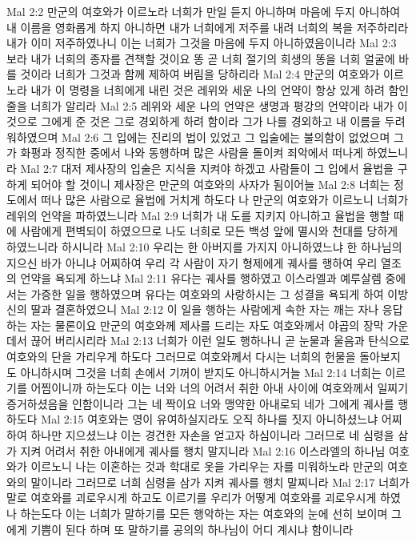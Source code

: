Mal 2:2  만군의 여호와가 이르노라 너희가 만일 듣지 아니하며 마음에 두지 아니하여 내 이름을 영화롭게 하지 아니하면 내가 너희에게 저주를 내려 너희의 복을 저주하리라 내가 이미 저주하였나니 이는 너희가 그것을 마음에 두지 아니하였음이니라
Mal 2:3  보라 내가 너희의 종자를 견책할 것이요 똥 곧 너희 절기의 희생의 똥을 너희 얼굴에 바를 것이라 너희가 그것과 함께 제하여 버림을 당하리라
Mal 2:4  만군의 여호와가 이르노라 내가 이 명령을 너희에게 내린 것은 레위와 세운 나의 언약이 항상 있게 하려 함인 줄을 너희가 알리라
Mal 2:5  레위와 세운 나의 언약은 생명과 평강의 언약이라 내가 이것으로 그에게 준 것은 그로 경외하게 하려 함이라 그가 나를 경외하고 내 이름을 두려워하였으며
Mal 2:6  그 입에는 진리의 법이 있었고 그 입술에는 불의함이 없었으며 그가 화평과 정직한 중에서 나와 동행하며 많은 사람을 돌이켜 죄악에서 떠나게 하였느니라
Mal 2:7  대저 제사장의 입술은 지식을 지켜야 하겠고 사람들이 그 입에서 율법을 구하게 되어야 할 것이니 제사장은 만군의 여호와의 사자가 됨이어늘
Mal 2:8  너희는 정도에서 떠나 많은 사람으로 율법에 거치게 하도다 나 만군의 여호와가 이르노니 너희가 레위의 언약을 파하였느니라
Mal 2:9  너희가 내 도를 지키지 아니하고 율법을 행할 때에 사람에게 편벽되이 하였으므로 나도 너희로 모든 백성 앞에 멸시와 천대를 당하게 하였느니라 하시니라
Mal 2:10  우리는 한 아버지를 가지지 아니하였느냐 한 하나님의 지으신 바가 아니냐 어찌하여 우리 각 사람이 자기 형제에게 궤사를 행하여 우리 열조의 언약을 욕되게 하느냐
Mal 2:11  유다는 궤사를 행하였고 이스라엘과 예루살렘 중에서는 가증한 일을 행하였으며 유다는 여호와의 사랑하시는 그 성결을 욕되게 하여 이방 신의 딸과 결혼하였으니
Mal 2:12  이 일을 행하는 사람에게 속한 자는 깨는 자나 응답하는 자는 물론이요 만군의 여호와께 제사를 드리는 자도 여호와께서 야곱의 장막 가운데서 끊어 버리시리라
Mal 2:13  너희가 이런 일도 행하나니 곧 눈물과 울음과 탄식으로 여호와의 단을 가리우게 하도다 그러므로 여호와께서 다시는 너희의 헌물을 돌아보지도 아니하시며 그것을 너희 손에서 기꺼이 받지도 아니하시거늘
Mal 2:14  너희는 이르기를 어찜이니까 하는도다 이는 너와 너의 어려서 취한 아내 사이에 여호와께서 일찌기 증거하셨음을 인함이니라 그는 네 짝이요 너와 맹약한 아내로되 네가 그에게 궤사를 행하도다
Mal 2:15  여호와는 영이 유여하실지라도 오직 하나를 짓지 아니하셨느냐 어찌하여 하나만 지으셨느냐 이는 경건한 자손을 얻고자 하심이니라 그러므로 네 심령을 삼가 지켜 어려서 취한 아내에게 궤사를 행치 말지니라
Mal 2:16  이스라엘의 하나님 여호와가 이르노니 나는 이혼하는 것과 학대로 옷을 가리우는 자를 미워하노라 만군의 여호와의 말이니라 그러므로 너희 심령을 삼가 지켜 궤사를 행치 말찌니라
Mal 2:17  너희가 말로 여호와를 괴로우시게 하고도 이르기를 우리가 어떻게 여호와를 괴로우시게 하였나 하는도다 이는 너희가 말하기를 모든 행악하는 자는 여호와의 눈에 선히 보이며 그에게 기쁨이 된다 하며 또 말하기를 공의의 하나님이 어디 계시냐 함이니라
